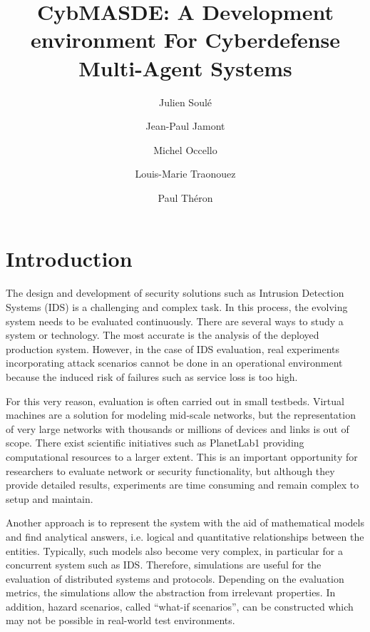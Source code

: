 \documentclass[sigconf]{aamas}
\title[AAMAS-2024 CybMASDE]{CybMASDE: A Development environment For Cyberdefense Multi-Agent Systems}
\author{Julien Soulé}
\affiliation{
  \institution{Univ. Grenoble Alpes}
  \city{Valence}
  \country{France}}
\author{Jean-Paul Jamont}
\affiliation{
  \institution{Univ. Grenoble Alpes}
  \city{Valence}
  \country{France}}
\author{Michel Occello}
\affiliation{
  \institution{Univ. Grenoble Alpes}
  \city{Valence}
  \country{France}}
\author{Louis-Marie Traonouez}
\affiliation{
  \institution{Thales Land and Air Systems, BU IAS}
  \city{Rennes}
  \country{France}}
\author{Paul Théron}
\affiliation{
  \institution{AICA IWG}
  \city{La Guillermie}
  \country{France}}
\begin{document}

\pagestyle{fancy}
\fancyhead{}


\maketitle 


\section{Introduction}

The design and development of security solutions such as Intrusion Detection Systems (IDS) is a challenging and complex task. In this process, the evolving system needs to be evaluated continuously. There are several ways to study a system or technology. The most accurate is the analysis of the deployed production system. However, in the case of IDS evaluation, real experiments incorporating attack scenarios cannot be done in an operational environment because the induced risk of failures such as service loss is too high.

For this very reason, evaluation is often carried out in small testbeds. Virtual machines are a solution for modeling mid-scale networks, but the representation of very large networks with thousands or millions of devices and links is out of scope. There exist scientific initiatives such as PlanetLab1 providing computational resources to a larger extent.
This is an important opportunity for researchers to evaluate network or security functionality, but although they provide detailed results, experiments are time consuming and remain complex to setup and maintain.

Another approach is to represent the system with the aid of mathematical models and find analytical answers, i.e. logical and quantitative relationships between the entities.
Typically, such models also become very complex, in particular for a concurrent system such as IDS. Therefore, simulations are useful for the evaluation of distributed systems and protocols. Depending on the evaluation metrics, the simulations allow the abstraction from irrelevant properties.
In addition, hazard scenarios, called “what-if scenarios”, can be constructed which may not be possible in real-world test environments.
\end{document}
